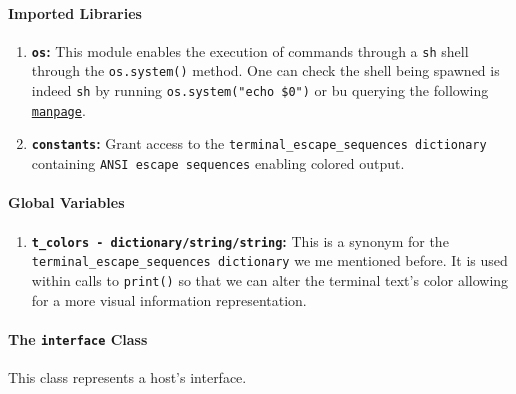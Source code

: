     \paragraph{Imported Libraries}
        \begin{enumerate}
            \item \textbf{\texttt{os}:} This module enables the execution of commands through a \texttt{sh} shell through the \texttt{os.system()} method. One can check the shell being spawned is indeed \texttt{sh} by running \texttt{\allowbreak os.system("echo \$0")} or bu querying the following \href{https://linux.die.net/man/3/system}{\texttt{manpage}}.
            \item \textbf{\texttt{constants}:} Grant access to the \texttt{\allowbreak terminal\_escape\_sequences dictionary} containing \texttt{ANSI escape sequences} enabling colored output.
        \end{enumerate}

    \paragraph{Global Variables}
        \begin{enumerate}
            \item \textbf{\texttt{\allowbreak t\_colors - dictionary/string/string}:} This is a synonym for the \texttt{\allowbreak terminal\_escape\_sequences dictionary} we me mentioned before. It is used within calls to \texttt{print()} so that we can alter the terminal text's color allowing for a more visual information representation.
        \end{enumerate}

    \paragraph{The \texttt{interface} Class}
        This class represents a host's interface.

